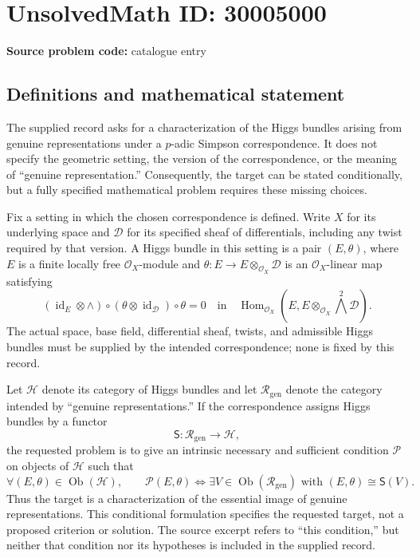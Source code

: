 \documentclass[11pt]{article}
\begin{document}
\section*{UnsolvedMath ID: 30005000}
\textbf{Source problem code:} catalogue entry
\subsection{Definitions and mathematical statement}
The supplied record asks for a characterization of the Higgs bundles arising from genuine representations under a \(p\)-adic Simpson correspondence. It does not specify the geometric setting, the version of the correspondence, or the meaning of ``genuine representation.'' Consequently, the target can be stated conditionally, but a fully specified mathematical problem requires these missing choices.

Fix a setting in which the chosen correspondence is defined. Write \(X\) for its underlying space and \(\mathcal D\) for its specified sheaf of differentials, including any twist required by that version. A Higgs bundle in this setting is a pair \((E,\theta)\), where \(E\) is a finite locally free \(\mathcal O_X\)-module and \(\theta:E\to E\otimes_{\mathcal O_X}\mathcal D\) is an \(\mathcal O_X\)-linear map satisfying
\[
(\operatorname{id}_E\otimes\wedge)\circ(\theta\otimes\operatorname{id}_{\mathcal D})\circ\theta=0
\quad\text{in}\quad
\operatorname{Hom}_{\mathcal O_X}\!\left(E,E\otimes_{\mathcal O_X}\bigwedge^2\mathcal D\right).
\]
The actual space, base field, differential sheaf, twists, and admissible Higgs bundles must be supplied by the intended correspondence; none is fixed by this record.

Let \(\mathcal H\) denote its category of Higgs bundles and let \(\mathcal R_{\mathrm{gen}}\) denote the category intended by ``genuine representations.'' If the correspondence assigns Higgs bundles by a functor
\[
\mathsf S:\mathcal R_{\mathrm{gen}}\longrightarrow\mathcal H,
\]
the requested problem is to give an intrinsic necessary and sufficient condition \(\mathcal P\) on objects of \(\mathcal H\) such that
\[
\forall (E,\theta)\in\operatorname{Ob}(\mathcal H),\qquad
\mathcal P(E,\theta)
\iff
\exists V\in\operatorname{Ob}(\mathcal R_{\mathrm{gen}})\text{ with }(E,\theta)\cong\mathsf S(V).
\]
Thus the target is a characterization of the essential image of genuine representations. This conditional formulation specifies the requested target, not a proposed criterion or solution. The source excerpt refers to ``this condition,'' but neither that condition nor its hypotheses is included in the supplied record.
\end{document}
